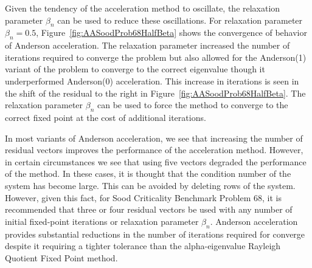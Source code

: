 Given the tendency of the acceleration method to oscillate, the relaxation parameter $\beta_{n}$ can be used to reduce these oscillations. For relaxation parameter $\beta_{n} = 0.5$, Figure~\ref{fig:AASoodProb68HalfBeta} shows the convergence of behavior of Anderson acceleration. The relaxation parameter increased the number of iterations required to converge the problem but also allowed for the Anderson(1) variant of the problem to converge to the correct eigenvalue though it underperformed Anderson(0) acceleration. This increase in iterations is seen in the shift of the residual to the right in Figure~\ref{fig:AASoodProb68HalfBeta}. The relaxation parameter $\beta_{n}$ can be used to force the method to converge to the correct fixed point at the cost of additional iterations.

In most variants of Anderson acceleration, we see that increasing the number of residual vectors improves the performance of the acceleration method. However, in certain circumstances we see that using five vectors degraded the performance of the method. In these cases, it is thought that the condition number of the system has become large. This can be avoided by deleting rows of the system. However, given this fact, for Sood Criticality Benchmark Problem 68, it is recommended that three or four residual vectors be used with any number of initial fixed-point iterations or relaxation parameter $\beta_{n}$. Anderson acceleration provides substantial reductions in the number of iterations required for converge despite it requiring a tighter tolerance than the alpha-eigenvalue Rayleigh Quotient Fixed Point method.

